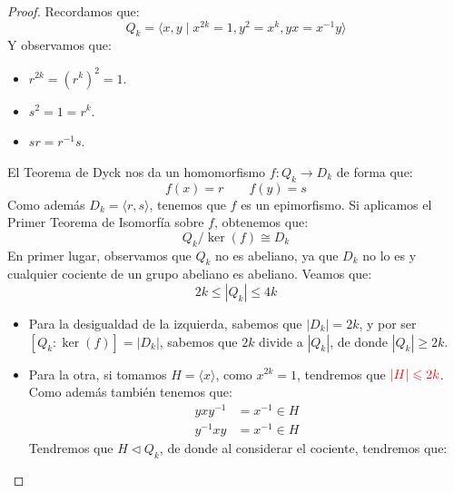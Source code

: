 \begin{ejemplo}
\begin{itemize}
\begin{proof}
                Recordamos que:
                \begin{equation*}
                    Q_k = \langle x,y \mid x^{2k} = 1, y^2 = x^k, yx=x^{-1}y \rangle 
                \end{equation*}
                Y observamos que:
                \begin{itemize}
                    \item $r^{2k} = {(r^k)}^{2} = 1$.
                    \item $s^2 = 1 = r^k$.
                    \item $sr = r^{-1}s$.
                \end{itemize}
                El Teorema de Dyck nos da un homomorfismo $f:Q_k\to D_k$ de forma que:
                \begin{equation*}
                    f(x) = r \qquad f(y) = s
                \end{equation*}
                Como además $D_k = \langle r,s \rangle $, tenemos que $f$ es un epimorfismo. Si aplicamos el Primer Teorema de Isomorfía sobre $f$, obtenemos que:
                \begin{equation*}
                    Q_k / \ker(f) \cong D_k
                \end{equation*}
                En primer lugar, observamos que $Q_k$ no es abeliano, ya que $D_k$ no lo es y cualquier cociente de un grupo abeliano es abeliano. Veamos que: 
                \begin{equation*}
                    2k \leq |Q_k| \leq 4k
                \end{equation*}
                \begin{itemize}
                    \item Para la desigualdad de la izquierda, sabemos que $|D_k| = 2k$, y por ser $[Q_k : \ker(f)] = |D_k|$, sabemos que $2k$ divide a $|Q_k|$, de donde $|Q_k| \geq 2k$.
                    \item Para la otra, si tomamos $H = \langle x \rangle $, como $x^{2k} = 1$, tendremos que ${\color{red}|H| \leqslant 2k}$. Como además también tenemos que:
                        \begin{align*}
                            yxy^{-1} &= x^{-1} \in  H \\
                            y^{-1}xy &= x^{-1} \in H
                        \end{align*}
                        Tendremos que $H\lhd Q_k$, de donde al considerar el cociente, tendremos que:
                        \begin{equation*}

\end{equation*}
\end{itemize}
\end{proof}
\end{itemize}
\end{ejemplo}
